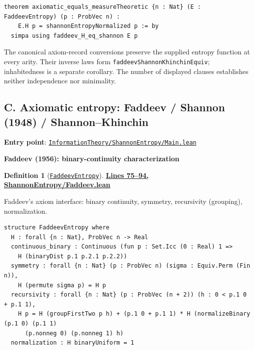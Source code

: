 \documentclass[11pt]{article}
\theoremstyle{definition}
\newtheorem{definition}[theorem]{Definition}
\theoremstyle{remark}
\begin{document}
\begin{lstlisting}[caption={Axioms-to-measures bridge (Faddeev -> Shannon)}]
theorem axiomatic_equals_measureTheoretic {n : Nat} (E : FaddeevEntropy) (p : ProbVec n) :
    E.H p = shannonEntropyNormalized p := by
  simpa using faddeev_H_eq_shannon E p
\end{lstlisting}

The canonical axiom-record conversions preserve the supplied entropy function at every arity.
Their inverse laws form \texttt{faddeevShannonKhinchinEquiv}; inhabitedness is a separate corollary.
The number of displayed clauses establishes neither independence nor minimality.

\subsection*{C. Axiomatic entropy: Faddeev / Shannon (1948) / Shannon--Khinchin}

\textbf{Entry point}: \href{https://github.com/zariuq/MeTTapedia/blob/main/lean/mettapedia/Mettapedia/InformationTheory/ShannonEntropy/Main.lean}{\texttt{InformationTheory/ShannonEntropy/Main.lean}}

\medskip
\textbf{Faddeev (1956): binary-continuity characterization}

\begin{definition}[\href{https://github.com/zariuq/ks-foundations-of-inference/blob/main/InformationTheory/ShannonEntropy/Faddeev.lean\#L77}{\texttt{FaddeevEntropy}}]
\textbf{\href{https://github.com/zariuq/ks-foundations-of-inference/blob/main/InformationTheory/ShannonEntropy/Faddeev.lean\#L75-L94}{Lines 75--94, ShannonEntropy/Faddeev.lean}}

Faddeev's axiom interface: binary continuity, symmetry, recursivity (grouping), normalization.
\end{definition}

\begin{lstlisting}[caption={Faddeev axioms (binary-continuity interface)}]
structure FaddeevEntropy where
  H : forall {n : Nat}, ProbVec n -> Real
  continuous_binary : Continuous (fun p : Set.Icc (0 : Real) 1 =>
    H (binaryDist p.1 p.2.1 p.2.2))
  symmetry : forall {n : Nat} (p : ProbVec n) (sigma : Equiv.Perm (Fin n)),
    H (permute sigma p) = H p
  recursivity : forall {n : Nat} (p : ProbVec (n + 2)) (h : 0 < p.1 0 + p.1 1),
    H p = H (groupFirstTwo p h) + (p.1 0 + p.1 1) * H (normalizeBinary (p.1 0) (p.1 1)
      (p.nonneg 0) (p.nonneg 1) h)
  normalization : H binaryUniform = 1
\end{lstlisting}
\end{document}
